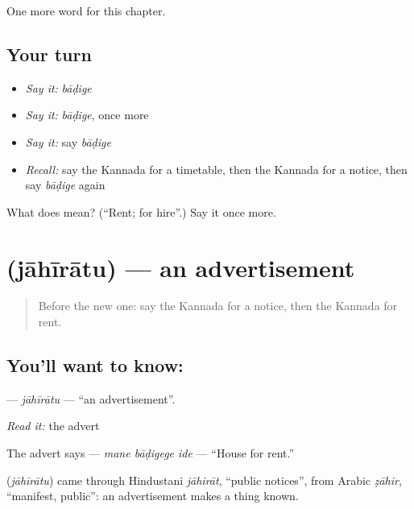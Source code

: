 \begin{grammarlens}[title={What you've built}]
One more word for this chapter.
\end{grammarlens}

\subsection*{Your turn}
\begin{itemize}
\raggedright
  \item \emph{Say it:} \emph{bāḍige}
  \item \emph{Say it:} \emph{bāḍige}, once more
  \item \emph{Say it:} say \emph{bāḍige}
  \item \emph{Recall:} say the Kannada for a timetable, then the Kannada for a notice, then say \emph{bāḍige} again
\end{itemize}

\begin{tcolorbox}[breakable,colback=teal!4,colframe=teal!35!black,title={Before you move on}]
What does  mean? (\textquotedblleft{}Rent; for hire\textquotedblright{}.) Say it once more.
\end{tcolorbox}
\section[\texorpdfstring{\kn{ಜಾಹೀರಾತು} (jāhīrātu)}{ಜಾಹೀರಾತು (jāhīrātu)}]{ (jāhīrātu) — an advertisement}

\label{lesson:KA-C157-jahiratu}



\begin{quote}
Before the new one: say the Kannada for a notice, then the Kannada for rent.
\end{quote}

\subsection*{You'll want to know: }
\textbf{} — \emph{jāhīrātu} — \textquotedblleft{}an advertisement\textquotedblright{}.

\emph{Read it:} the advert

The advert says \textbf{  } — \emph{mane bāḍigege ide} — \textquotedblleft{}House for rent.\textquotedblright{}

\begin{cousinweb}
\textbf{} (\emph{jāhīrātu}) came through Hindustani \emph{jāhirāt}, \textquotedblleft{}public notices\textquotedblright{}, from Arabic \emph{ẓāhir}, \textquotedblleft{}manifest, public\textquotedblright{}: an advertisement makes a thing known.
\end{cousinweb}

